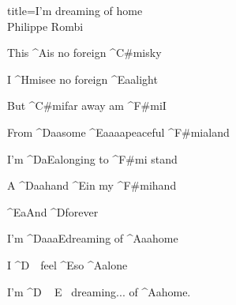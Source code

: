 \begin{song}{title=\centering I'm dreaming of home \\\normalsize Philippe Rombi \vspace*{-0.3cm}}
{\begin{minipage}[t]{0.48\textwidth}
\end{minipage}\begin{minipage}[t]{0.48\textwidth}\setlength{\parindent}{0.45cm}  %
\vspace*{0.6cm}

\sloka	
	This ^{A}is no foreign  ^{C#mi}sky
	
	I ^{Hmi}see no foreign ^{E{\color{white}aa}}light
	
	But  ^{C#mi}far away am ^{F#mi}I
	
	From ^{D{\color{white}aa}}some ^{E{\color{white}aaaa}}peaceful  ^{F#mi{\color{white}a}}land
	
	I'm ^{D{\color{white}a}E{\color{white}a}}longing to ^{F#mi\,\,}stand
	
	A ^{D{\color{white}aa}}hand ^{E}in my  ^{F#mi}hand
	
	 ^{E{\color{white}a}}And ^{D}forever
	
	I'm ^{D{\color{white}aaa}E}dreaming of ^{A{\color{white}aa}}home
	
	I ^{D\,\,\,\,\,\,}feel ^{E}so ^{A}alone
	
	I'm ^{D\,\,\,\,\,\,\,E\,\,\,\,\,}dreaming... of ^{A{\color{white}a}}home.

\end{minipage}   %
}
\setcounter{Slokočet}{0}
\end{song}

